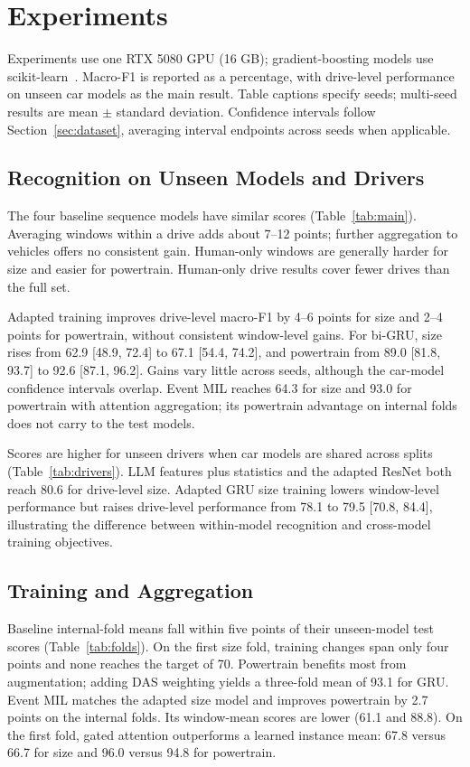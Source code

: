 \section{Experiments}\label{sec:experiments}

Experiments use one RTX 5080 GPU (16 GB); gradient-boosting models use scikit-learn~\cite{pedregosa2011sklearn}. Macro-F1 is reported as a percentage, with drive-level performance on unseen car models as the main result. Table captions specify seeds; multi-seed results are mean $\pm$ standard deviation. Confidence intervals follow Section~\ref{sec:dataset}, averaging interval endpoints across seeds when applicable.

\subsection{Recognition on Unseen Models and Drivers}
The four baseline sequence models have similar scores (Table~\ref{tab:main}). Averaging windows within a drive adds about 7--12 points; further aggregation to vehicles offers no consistent gain. Human-only windows are generally harder for size and easier for powertrain. Human-only drive results cover fewer drives than the full set.



Adapted training improves drive-level macro-F1 by 4--6 points for size and 2--4 points for powertrain, without consistent window-level gains. For bi-GRU, size rises from 62.9 [48.9, 72.4] to 67.1 [54.4, 74.2], and powertrain from 89.0 [81.8, 93.7] to 92.6 [87.1, 96.2]. Gains vary little across seeds, although the car-model confidence intervals overlap. Event MIL reaches 64.3 for size and 93.0 for powertrain with attention aggregation; its powertrain advantage on internal folds does not carry to the test models.

Scores are higher for unseen drivers when car models are shared across splits (Table~\ref{tab:drivers}). LLM features plus statistics and the adapted ResNet both reach 80.6 for drive-level size. Adapted GRU size training lowers window-level performance but raises drive-level performance from 78.1 to 79.5 [70.8, 84.4], illustrating the difference between within-model recognition and cross-model training objectives.



\subsection{Training and Aggregation}
Baseline internal-fold means fall within five points of their unseen-model test scores (Table~\ref{tab:folds}). On the first size fold, training changes span only four points and none reaches the target of 70. Powertrain benefits most from augmentation; adding DAS weighting yields a three-fold mean of 93.1 for GRU. Event MIL matches the adapted size model and improves powertrain by 2.7 points on the internal folds. Its window-mean scores are lower (61.1 and 88.8). On the first fold, gated attention outperforms a learned instance mean: 67.8 versus 66.7 for size and 96.0 versus 94.8 for powertrain.

